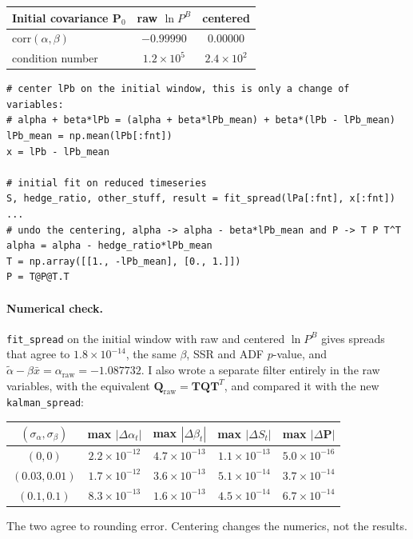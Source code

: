 \documentclass[11pt]{article}
\newcommand{\bs}[1]{\boldsymbol{#1}}
\begin{document}
\begin{center}
\begin{tabular}{lcc}
    \toprule
    Initial covariance $\bs{P}_0$ & raw $\ln P^B$ & centered \\
    \midrule
    corr$(\alpha, \beta)$ & $-0.99990$ & $0.00000$ \\
    condition number & $1.2\times 10^5$ & $2.4\times 10^2$ \\
    \bottomrule
\end{tabular}
\end{center}

\begin{lstlisting}
# center lPb on the initial window, this is only a change of variables:
# alpha + beta*lPb = (alpha + beta*lPb_mean) + beta*(lPb - lPb_mean)
lPb_mean = np.mean(lPb[:fnt])
x = lPb - lPb_mean

# initial fit on reduced timeseries
S, hedge_ratio, other_stuff, result = fit_spread(lPa[:fnt], x[:fnt])
...
# undo the centering, alpha -> alpha - beta*lPb_mean and P -> T P T^T
alpha = alpha - hedge_ratio*lPb_mean
T = np.array([[1., -lPb_mean], [0., 1.]])
P = T@P@T.T
\end{lstlisting}

\paragraph{Numerical check.} \texttt{fit\_spread} on the initial window with
raw and centered $\ln P^B$ gives spreads that agree to $1.8\times10^{-14}$, the
same $\beta$, SSR and ADF $p$-value, and
$\tilde\alpha - \beta\bar{x} = \alpha_{\text{raw}} = -1.087732$. I also wrote
a separate filter entirely in the raw variables, with the equivalent
$\bs{Q}_{\text{raw}} = \bs{T}\bs{Q}\bs{T}^T$, and compared it with the new
\texttt{kalman\_spread}:

\begin{center}
\begin{tabular}{ccccc}
    \toprule
    $(\sigma_\alpha, \sigma_\beta)$ & max $|\Delta\alpha_t|$ &
    max $|\Delta\beta_t|$ & max $|\Delta S_t|$ & max $|\Delta \bs{P}|$ \\
    \midrule
    $(0, 0)$      & $2.2\times10^{-12}$ & $4.7\times10^{-13}$ & $1.1\times10^{-13}$ & $5.0\times10^{-16}$ \\
    $(0.03, 0.01)$ & $1.7\times10^{-12}$ & $3.6\times10^{-13}$ & $5.1\times10^{-14}$ & $3.7\times10^{-14}$ \\
    $(0.1, 0.1)$   & $8.3\times10^{-13}$ & $1.6\times10^{-13}$ & $4.5\times10^{-14}$ & $6.7\times10^{-14}$ \\
    \bottomrule
\end{tabular}
\end{center}
The two agree to rounding error. Centering changes the numerics, not the
results.
\end{document}
